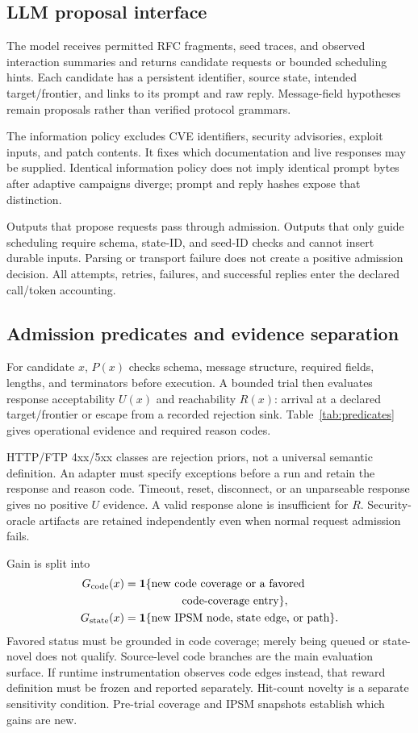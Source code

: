 \documentclass[final,5p,times,number]{elsarticle}
\newcommand{\gcode}{G_{\mathrm{code}}}
\newcommand{\gstate}{G_{\mathrm{state}}}
\begin{document}
\subsection{LLM proposal interface}
The model receives permitted RFC fragments, seed traces, and observed interaction summaries and returns candidate requests or bounded scheduling hints. Each candidate has a persistent identifier, source state, intended target/frontier, and links to its prompt and raw reply. Message-field hypotheses remain proposals rather than verified protocol grammars.

The information policy excludes CVE identifiers, security advisories, exploit inputs, and patch contents. It fixes which documentation and live responses may be supplied. Identical information policy does not imply identical prompt bytes after adaptive campaigns diverge; prompt and reply hashes expose that distinction.

Outputs that propose requests pass through admission. Outputs that only guide scheduling require schema, state-ID, and seed-ID checks and cannot insert durable inputs. Parsing or transport failure does not create a positive admission decision. All attempts, retries, failures, and successful replies enter the declared call/token accounting.

\subsection{Admission predicates and evidence separation}
For candidate $x$, $P(x)$ checks schema, message structure, required fields, lengths, and terminators before execution. A bounded trial then evaluates response acceptability $U(x)$ and reachability $R(x)$: arrival at a declared target/frontier or escape from a recorded rejection sink. Table~\ref{tab:predicates} gives operational evidence and required reason codes.

HTTP/FTP 4xx/5xx classes are rejection priors, not a universal semantic definition. An adapter must specify exceptions before a run and retain the response and reason code. Timeout, reset, disconnect, or an unparseable response gives no positive $U$ evidence. A valid response alone is insufficient for $R$. Security-oracle artifacts are retained independently even when normal request admission fails.

Gain is split into
\begin{align}
\gcode(x)&=\mathbf{1}\{\text{new code coverage or a favored}\nonumber\\
&\hspace{18mm}\text{code-coverage entry}\},\label{eq:gcode}\\
\gstate(x)&=\mathbf{1}\{\text{new IPSM node, state edge, or path}\}.\label{eq:gstate}
\end{align}
Favored status must be grounded in code coverage; merely being queued or state-novel does not qualify. Source-level code branches are the main evaluation surface. If runtime instrumentation observes code edges instead, that reward definition must be frozen and reported separately. Hit-count novelty is a separate sensitivity condition. Pre-trial coverage and IPSM snapshots establish which gains are new.
\end{document}
